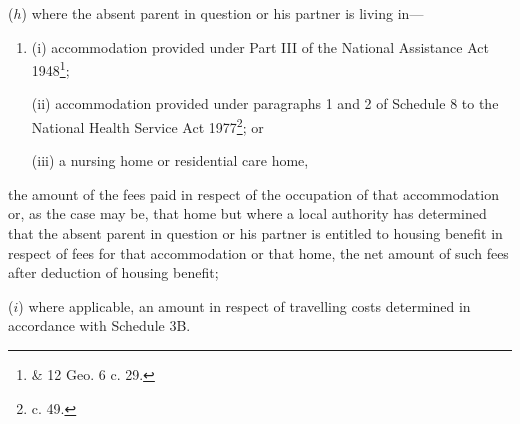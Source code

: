 \documentclass[12pt,a4paper]{article}
\begin{document}
\begin{enumerate}
($h$) where the absent parent in question or his partner is living in—
\begin{enumerate}\item[]
(i) accommodation provided under Part III of the National Assistance Act 1948\footnote{ \& 12 Geo. 6 c. 29.};

(ii) accommodation provided under paragraphs 1 and 2 of Schedule 8 to the National Health Service Act 1977\footnote{ c. 49.}; or

(iii) a nursing home or residential care home,
\end{enumerate}
the amount of the fees paid in respect of the occupation of that accommodation or, as the case may be, that home
but where a local authority has determined that the absent parent in question or his partner is entitled to housing benefit in respect of fees for that accommodation or that home, the net amount of such fees after deduction of housing benefit;  %

($i$) where applicable, an amount in respect of travelling costs determined in accordance with Schedule 3B.
\end{enumerate}
\end{document}
